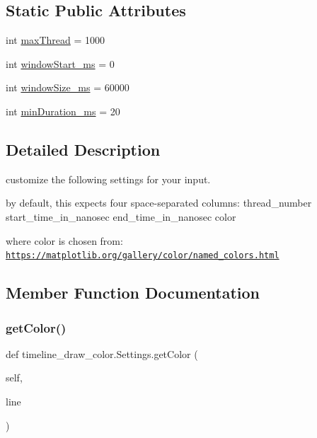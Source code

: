 \subsection*{Static Public Attributes}
\begin{DoxyCompactItemize}
\item 
int \hyperlink{classtimeline__draw__color_1_1Settings_ae036d957c043e96fe8a7dfc658d66192}{max\+Thread} = 1000
\item 
int \hyperlink{classtimeline__draw__color_1_1Settings_a25e564d0bba827827a724b41d8c99f61}{window\+Start\+\_\+ms} = 0
\item 
int \hyperlink{classtimeline__draw__color_1_1Settings_a0f8a0096c566ebfd9a82902638611bb3}{window\+Size\+\_\+ms} = 60000
\item 
int \hyperlink{classtimeline__draw__color_1_1Settings_a8886752d8712ba980ee9662d1456d263}{min\+Duration\+\_\+ms} = 20
\end{DoxyCompactItemize}


\subsection{Detailed Description}
customize the following settings for your input. 

by default, this expects four space-\/separated columns\+: thread\+\_\+number start\+\_\+time\+\_\+in\+\_\+nanosec end\+\_\+time\+\_\+in\+\_\+nanosec color

where color is chosen from\+: \href{https://matplotlib.org/gallery/color/named_colors.html}{\tt https\+://matplotlib.\+org/gallery/color/named\+\_\+colors.\+html} 

\subsection{Member Function Documentation}
\mbox{\label{classtimeline__draw__color_1_1Settings_a8391566e3f9b345fe61d8132f31dd546}} 
\subsubsection{\texorpdfstring{get\+Color()}{getColor()}}
{\footnotesize\ttfamily def timeline\+\_\+draw\+\_\+color.\+Settings.\+get\+Color (\begin{DoxyParamCaption}\item[{}]{self,  }\item[{}]{line }\end{DoxyParamCaption})}



